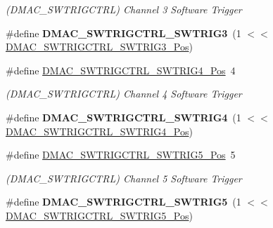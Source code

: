 \begin{DoxyCompactItemize}
\begin{DoxyCompactList}\small\item\em (D\+M\+A\+C\+\_\+\+S\+W\+T\+R\+I\+G\+C\+T\+R\+L) Channel 3 Software Trigger \end{DoxyCompactList}\item 
\hypertarget{group___s_a_m_l21___d_m_a_c_ga9cb68aa42ce204eed9d6e0be7d2e9e7d}{}\#define {\bfseries D\+M\+A\+C\+\_\+\+S\+W\+T\+R\+I\+G\+C\+T\+R\+L\+\_\+\+S\+W\+T\+R\+I\+G3}~(1 $<$$<$ \hyperlink{group___s_a_m_l21___d_m_a_c_ga116d94d4f4ed98c7f47fb91ee911ca1e}{D\+M\+A\+C\+\_\+\+S\+W\+T\+R\+I\+G\+C\+T\+R\+L\+\_\+\+S\+W\+T\+R\+I\+G3\+\_\+\+Pos})\label{group___s_a_m_l21___d_m_a_c_ga9cb68aa42ce204eed9d6e0be7d2e9e7d}

\item 
\hypertarget{group___s_a_m_l21___d_m_a_c_ga012eb24abb291ce4471d9efb00a50f00}{}\#define \hyperlink{group___s_a_m_l21___d_m_a_c_ga012eb24abb291ce4471d9efb00a50f00}{D\+M\+A\+C\+\_\+\+S\+W\+T\+R\+I\+G\+C\+T\+R\+L\+\_\+\+S\+W\+T\+R\+I\+G4\+\_\+\+Pos}~4\label{group___s_a_m_l21___d_m_a_c_ga012eb24abb291ce4471d9efb00a50f00}

\begin{DoxyCompactList}\small\item\em (D\+M\+A\+C\+\_\+\+S\+W\+T\+R\+I\+G\+C\+T\+R\+L) Channel 4 Software Trigger \end{DoxyCompactList}\item 
\hypertarget{group___s_a_m_l21___d_m_a_c_gae3c4c471ad55c5ad9aefcd3cfb45b175}{}\#define {\bfseries D\+M\+A\+C\+\_\+\+S\+W\+T\+R\+I\+G\+C\+T\+R\+L\+\_\+\+S\+W\+T\+R\+I\+G4}~(1 $<$$<$ \hyperlink{group___s_a_m_l21___d_m_a_c_ga012eb24abb291ce4471d9efb00a50f00}{D\+M\+A\+C\+\_\+\+S\+W\+T\+R\+I\+G\+C\+T\+R\+L\+\_\+\+S\+W\+T\+R\+I\+G4\+\_\+\+Pos})\label{group___s_a_m_l21___d_m_a_c_gae3c4c471ad55c5ad9aefcd3cfb45b175}

\item 
\hypertarget{group___s_a_m_l21___d_m_a_c_ga6d1bfd2314018c1e448892ddc579bb0f}{}\#define \hyperlink{group___s_a_m_l21___d_m_a_c_ga6d1bfd2314018c1e448892ddc579bb0f}{D\+M\+A\+C\+\_\+\+S\+W\+T\+R\+I\+G\+C\+T\+R\+L\+\_\+\+S\+W\+T\+R\+I\+G5\+\_\+\+Pos}~5\label{group___s_a_m_l21___d_m_a_c_ga6d1bfd2314018c1e448892ddc579bb0f}

\begin{DoxyCompactList}\small\item\em (D\+M\+A\+C\+\_\+\+S\+W\+T\+R\+I\+G\+C\+T\+R\+L) Channel 5 Software Trigger \end{DoxyCompactList}\item 
\hypertarget{group___s_a_m_l21___d_m_a_c_gaf666a1ad84471a2b87266ae427e69b5e}{}\#define {\bfseries D\+M\+A\+C\+\_\+\+S\+W\+T\+R\+I\+G\+C\+T\+R\+L\+\_\+\+S\+W\+T\+R\+I\+G5}~(1 $<$$<$ \hyperlink{group___s_a_m_l21___d_m_a_c_ga6d1bfd2314018c1e448892ddc579bb0f}{D\+M\+A\+C\+\_\+\+S\+W\+T\+R\+I\+G\+C\+T\+R\+L\+\_\+\+S\+W\+T\+R\+I\+G5\+\_\+\+Pos})\label{group___s_a_m_l21___d_m_a_c_gaf666a1ad84471a2b87266ae427e69b5e}


\end{DoxyCompactItemize}
